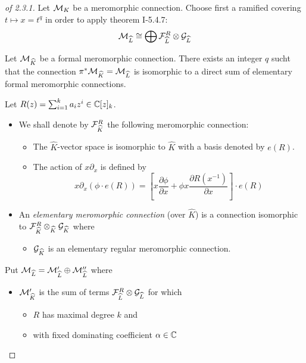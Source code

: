 \begin{proof}[of 2.3.1]
    Let $\mathcal{M}_K$ be a meromorphic connection. Choose first a ramified covering
  $t\mapsto x=t^q$ in order to apply theorem I-5.4.7:
  \[
    \mathcal{M}_{\widehat L}\cong\bigoplus\mathcal{F}_{\widehat L}^R\otimes\mathcal{G}_{\widehat L}
  \]
  \begin{thm}[I-5.4.7]
    Let $\mathcal{M}_{\widehat K}$ be a formal meromorphic connection. There exists an
    integer $q$ sucht that the connection $\pi^*\mathcal{M}_{\widehat K}=\mathcal{M}_{\widehat L}$ is
    isomorphic to a direct sum of elementary formal meromorphic connections.
    \begin{defn}[5.4.4 + 5.4.5]
      Let $R(z)=\sum_{i=1}^ka_iz^i\in\mathbb{C}[z]_k$.
      \begin{itemize}
        \item We shall denote by $\mathcal{F}_{\widehat K}^R$ the following meromorphic
          connection:
          \begin{itemize}
            \item The $\hat K$-vector space is isomorphic to $\hat K$ with a
              basis denoted by $e(R)$.
            \item
              The action of $x\partial_x$ is defined
              by
              \[
                x\partial_x(\phi\cdot e(R))=\left[
                  x\frac{\partial\phi}{\partial x}
                  +\phi x\frac{\partial R(x^{-1})}{\partial x}
                \right]\cdot e(R)
              \]
          \end{itemize}
        \item An \emph{elementary meromorphic connection} (over $\hat K$) is a
          connection isomorphic to $\mathcal{F}_{\widehat K}^R\otimes_{\widehat K}\mathcal{G}_{\widehat K}$
          where
          \begin{itemize}
            \item $\mathcal{G}_{\widehat K}$ is an elementary regular meromorphic
              connection.
          \end{itemize}
      \end{itemize}
    \end{defn}
  \end{thm}
  Put $\mathcal{M}_{\widehat L}=\mathcal{M}_{\widehat L}'\oplus\mathcal{M}_{\widehat L}''$ where
  \begin{itemize}
    \item $\mathcal{M}_{\widehat K}'$ is the sum of terms
      $\mathcal{F}_{\widehat L}^R\otimes\mathcal{G}_{\widehat L}$ for which
      \begin{itemize}
        \item $R$ has maximal degree $k$ and
        \item with fixed dominating coefficient $\alpha\in\mathbb{C}$

\end{itemize}
\end{itemize}
\end{proof}
